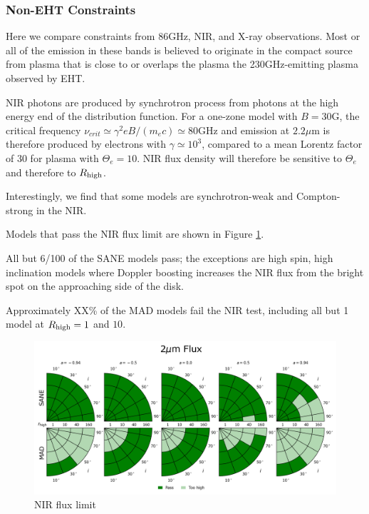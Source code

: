 \subsubsection{Non-EHT Constraints}

Here we compare constraints from 86GHz, NIR, and X-ray observations.  Most or all of the emission in these bands is believed to originate in the compact source from plasma that is close to or overlaps the plasma the 230GHz-emitting plasma observed by EHT.



NIR photons are produced by synchrotron process from photons at the high energy end of the distribution function.  For a one-zone model with $B = 30$G, the  critical frequency $\nu_{crit} \simeq \gamma^2 e B/(m_e c) \simeq 80$GHz and emission at $2.2\mu$m is therefore produced by electrons with $\gamma \simeq 10^3$, compared to a mean Lorentz factor of $30$ for plasma with $\Theta_e = 10$.  NIR flux density will therefore be sensitive to $\Theta_e$ and therefore to $R_\mathrm{high}$.

Interestingly, we find that some models are synchrotron-weak and Compton-strong in the NIR.  

Models that pass the NIR flux limit are shown in Figure \ref{fig:cmp_2um_flux}.

All but 6/100 of the SANE models pass; the exceptions are high spin, high inclination models where Doppler boosting increases the NIR flux from the bright spot on the approaching side of the disk.

Approximately XX\% of the MAD models fail the NIR test, including all but 1 model at $R_\mathrm{high} = 1$ and $10$.

\begin{figure}
  \centering
  \includegraphics[width=\columnwidth]{./figures/2um_flux_Constraints.png}
  \caption{NIR flux limit}
  \label{fig:cmp_2um_flux}
\end{figure}

